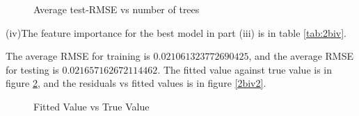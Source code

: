 \documentclass{article}
\begin{document}
\begin{figure}[!htbp]
\centering
{}
\caption{Average test-RMSE vs number of trees} \label{2biii2}
\end{figure}

(iv)The feature importance for the best model in part (iii) is in table \ref{tab:2biv}. 

\begin{table}[h]
\center
\caption{Feature Importance}
\label{tab:2biv}
\end{table}

The average RMSE for training is $0.021061323772690425$, and the average RMSE for testing is $0.021657162672114462$. The fitted value against true value is in figure \ref{2biv1}, and the residuals vs fitted values is in figure \ref{2biv2}. \\

\begin{figure}[!htbp]
\centering
{}
\caption{Fitted Value vs True Value} \label{2biv1}
\end{figure}
\end{document}
